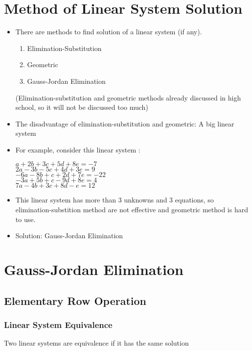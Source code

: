 \documentclass[a4paper,12pt]{article}
\begin{document}
\section*{Method of Linear System Solution}
\begin{itemize}
  \item There are methods to find solution of a linear system (if any).
        \begin{enumerate}
          \item Elimination-Substitution
          \item Geometric
          \item Gauss-Jordan Elimination
        \end{enumerate}
        (Elimination-substitution and geometric methods already discussed in high school, so it will not be discussed too much)
  \item The disadvantage of elimination-substitution and geometric: A big linear system
  \item[] For example, consider this linear system :
    \begin{center}
      \(a+2b+3c+5d+8e=-7\) \\
      \(2a-3b-5c+4d+3e=9\) \\
      \(-6a-8b+c+2d+7e=-22\) \\
      \(-3a+5b+c-9d+8e=4\) \\
      \(7a-4b+3c+8d-e=12\)
    \end{center}
  \item[] This linear system has more than 3 unknowns and 3 equations, so elimination-substition method are not effective and geometric method is hard to use.
  \item Solution: Gauss-Jordan Elimination
\end{itemize}

\section*{Gauss-Jordan Elimination}
\subsection*{Elementary Row Operation}
\subsubsection*{Linear System Equivalence}
Two linear systems are equivalence if it has the same solution
\end{document}
